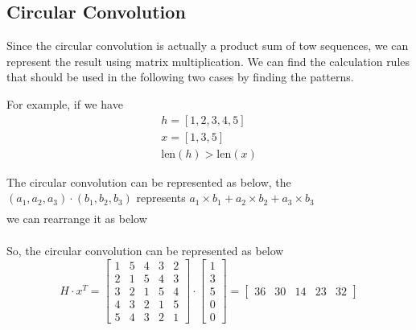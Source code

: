 \documentclass{article}
\begin{document}
\subsection{Circular Convolution}

Since the circular convolution is actually a product sum of tow sequences, we can represent the result using matrix multiplication. We can find the calculation rules that should be used in the following two cases by finding the patterns. 

For example, if we have 
\begin{gather*}
	h = [1, 2, 3, 4, 5] \\ 
	x = [1, 3, 5] \\ 
	\mathrm{len}(h) > \mathrm{len}(x)
\end{gather*}

The circular convolution can be represented as below, the $(a_1, a_2, a_3) \cdot (b_1, b_2, b_3)$ represents $a_1\times b_1 + a_2 \times b_2 + a_3 \times b_3$
\begin{align*}
[& \\ 
&(4, 5, 1) \cdot (5, 3, 1) ,\\ 
&(5, 1, 2) \cdot (5, 3, 1), \\ 
&(1, 2, 3) \cdot (5, 3, 1), \\ 
&(2, 3, 4) \cdot (5, 3, 1), \\ 
&(3, 4, 5) \cdot (5, 3, 1) \\ 
]&
\end{align*}
we can rearrange it as below
\begin{align*}
[& \\ 
&(1, 5, 4) \cdot (1, 3, 5) ,\\ 
&(2, 1, 5) \cdot (1, 3, 5), \\ 
&(3, 2, 1) \cdot (1, 3, 5), \\ 
&(4, 3, 2) \cdot (1, 3, 5), \\ 
&(5, 4, 3) \cdot (1, 3, 5) \\ 
]&
\end{align*}

So, the circular convolution can be represented as below
$$
H \cdot x^T = 
\begin{bmatrix}
	1 & 5 & 4 & 3 & 2 \\
	2 & 1 & 5 & 4 & 3 \\ 
	3 & 2 & 1 & 5 & 4 \\ 
	4 & 3 & 2 & 1 & 5 \\ 
	5 & 4 & 3 & 2 & 1
\end{bmatrix}
\cdot
\begin{bmatrix}
	1 \\ 
	3 \\ 
	5 \\ 
	0 \\ 
	0 
\end{bmatrix}
= 
\begin{bmatrix}
	36 & 30 & 14 & 23 & 32
\end{bmatrix}
$$
\end{document}
